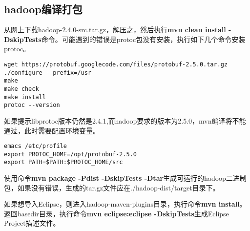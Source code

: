 \subsection{hadoop编译打包}
\par 从网上下载hadoop-2.4.0-src.tar.gz，解压之，然后执行\textbf{mvn clean install -DskipTests}命令。可能遇到的错误是protoc包没有安装，执行如下几个命令安装protoc。
\begin{verbatim}
wget https://protobuf.googlecode.com/files/protobuf-2.5.0.tar.gz
./configure --prefix=/usr
make
make check
make install
protoc --version
\end{verbatim}
如果提示libprotoc版本仍然是2.4.1,而hadoop要求的版本为2.5.0，mvn编译将不能通过，此时需要配置环境变量。
\begin{verbatim}
emacs /etc/profile
export PROTOC_HOME=/opt/protobuf-2.5.0
export PATH=$PATH:$PROTOC_HOME/src
\end{verbatim}
\par 使用命令\textbf{mvn package -Pdist -DskipTests -Dtar}生成可运行的hadoop二进制包，如果没有错误，生成的tar.gz文件应在./hadoop-dist/target目录下。
\par 如果想导入Eclipse，则进入hadoop-maven-plugins目录，执行命令\textbf{mvn install}。返回basedir目录，执行命令\textbf{mvn eclipse:eclipse -DskipTests}生成Eclipse Project描述文件。


